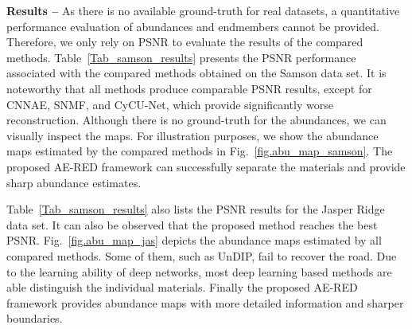 \documentclass[journal,a4paper]{IEEEtran}
\begin{document}
\noindent \textbf{Results --} 
 As there is no available ground-truth for real datasets, a quantitative performance evaluation of abundances and endmembers cannot be provided. Therefore, we only rely on PSNR to evaluate the results of the compared methods. Table~\ref{Tab_samson_results} presents the PSNR performance associated with the compared methods obtained on the Samson data set. It is noteworthy that all methods produce comparable PSNR results, except for CNNAE, SNMF, and CyCU-Net, which provide significantly worse reconstruction. Although there is no ground-truth for the abundances, we can visually inspect the maps. For illustration purposes, we show the abundance maps estimated by the compared methods in Fig.~\ref{fig.abu_map_samson}. The proposed AE-RED framework can successfully separate the materials and provide sharp abundance estimates.

Table~\ref{Tab_samson_results} also lists the PSNR results for the Jasper Ridge data set. 
It can also be observed that the proposed method reaches the best PSNR. Fig.~\ref{fig.abu_map_jas} depicts the abundance maps estimated by all compared methods. Some of them, such as UnDIP, fail to recover the road. Due to the learning ability of deep networks, most deep learning based methods are able distinguish the individual materials. Finally the proposed AE-RED framework provides abundance maps with more detailed information and sharper boundaries.
\end{document}
